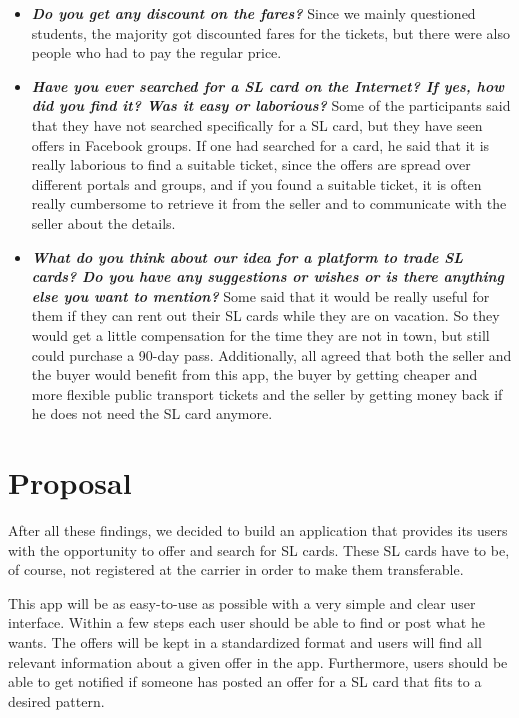 \documentclass[11pt,twoside,a4paper]{report}
\begin{document}
\begin{itemize}
	\item \textbf{\textit{Do you get any discount on the fares?}} Since we mainly questioned students, the majority got discounted fares for the tickets, but there were also people who had to pay the regular price.
	\item \textbf{\textit{Have you ever searched for a SL card on the Internet? If yes, how did you find it? Was it easy or laborious?}} Some of the participants said that they have not searched specifically for a SL card, but they have seen offers in Facebook groups. If one had searched for a card, he said that it is really laborious to find a suitable ticket, since the offers are spread over different portals and groups, and if you found a suitable ticket, it is often really cumbersome to retrieve it from the seller and to communicate with the seller about the details.
	\item \textbf{\textit{What do you think about our idea for a platform to trade SL cards? Do you have any suggestions or wishes or is there anything else you want to mention?}} Some said that it would be really useful for them if they can rent out their SL cards while they are on vacation. So they would get a little compensation for the time they are not in town, but still could purchase a 90-day pass. Additionally, all agreed that both the seller and the buyer would benefit from this app, the buyer by getting cheaper and more flexible public transport tickets and the seller by getting money back if he does not need the SL card anymore.
\end{itemize}

\section{Proposal}

After all these findings, we decided to build an application that provides its users with the opportunity to offer and search for SL cards. These SL cards have to be, of course, not registered at the carrier in order to make them transferable.

This app will be as easy-to-use as possible with a very simple and clear user interface. Within a few steps each user should be able to find or post what he wants. The offers will be kept in a standardized format and users will find all relevant information about a given offer in the app. Furthermore, users should be able to get notified if someone has posted an offer for a SL card that fits to a desired pattern.
\end{document}
